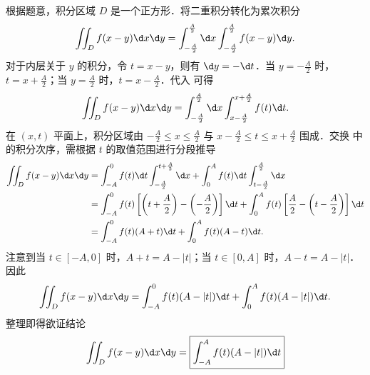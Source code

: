 \begin{myproof}
    根据题意，积分区域 $D$ 是一个正方形．将二重积分转化为累次积分
    \begin{equation}
        \label{eq:step-1}
        \iint_D f(x - y) \d x \d y = \int_{-\frac{A}{2}}^{\frac{A}{2}} \d x \int_{-\frac{A}{2}}^{\frac{A}{2}} f(x - y) \d y.
    \end{equation}
    对于内层关于 $y$ 的积分，令 $t = x - y$，则有 $\d y = -\d t$．当 $y = -\frac{A}{2}$ 时，$t = x + \frac{A}{2}$；当 $y = \frac{A}{2}$ 时，$t = x - \frac{A}{2}$．代入  可得
    \begin{equation}
        \label{eq:step-2}
        \iint_D f(x - y) \d x \d y = \int_{-\frac{A}{2}}^{\frac{A}{2}} \d x \int_{x - \frac{A}{2}}^{x + \frac{A}{2}} f(t) \d t.
    \end{equation}
    在 $(x, t)$ 平面上，积分区域由 $-\frac{A}{2} \le x \le \frac{A}{2}$ 与 $x - \frac{A}{2} \le t \le x + \frac{A}{2}$ 围成．交换  中的积分次序，需根据 $t$ 的取值范围进行分段推导
    \begin{equation}
        \begin{aligned}
            \iint_D f(x - y) \d x \d y & = \int_{-A}^{0} f(t) \d t \int_{-\frac{A}{2}}^{t + \frac{A}{2}} \d x + \int_{0}^{A} f(t) \d t \int_{t - \frac{A}{2}}^{\frac{A}{2}} \d x                                                    \\
                                       & = \int_{-A}^{0} f(t) \left[ \left( t + \frac{A}{2} \right) - \left( -\frac{A}{2} \right) \right] \d t + \int_{0}^{A} f(t) \left[ \frac{A}{2} - \left( t - \frac{A}{2} \right) \right] \d t \\
                                       & = \int_{-A}^{0} f(t) (A + t) \d t + \int_{0}^{A} f(t) (A - t) \d t.
        \end{aligned}
    \end{equation}
    注意到当 $t \in [-A, 0]$ 时，$A + t = A - |t|$；当 $t \in [0, A]$ 时，$A - t = A - |t|$．因此
    \begin{equation}
        \iint_D f(x - y) \d x \d y = \int_{-A}^0 f(t) (A - |t|) \d t + \int_0^A f(t) (A - |t|) \d t.
    \end{equation}
    整理即得欲证结论
    \begin{equation}
        \iint_D f(x - y) \d x \d y = \boxed{\int_{-A}^A f(t) (A - |t|) \d t}
    \end{equation}
\end{myproof}

\endinput
